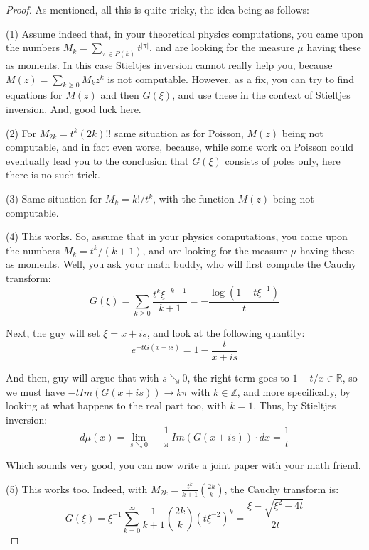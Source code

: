 \documentclass[12pt]{amsbook}
\begin{document}
\begin{proof}
As mentioned, all this is quite tricky, the idea being as follows:

\medskip

(1) Assume indeed that, in your theoretical physics computations, you came upon the numbers $M_k=\sum_{\pi\in P(k)}t^{|\pi|}$, and are looking for the measure $\mu$ having these as moments. In this case Stieltjes inversion cannot really help you, because $M(z)=\sum_{k\geq 0}M_kz^k$ is not computable. However, as a fix, you can try to find equations for $M(z)$ and then $G(\xi)$, and use these in the context of Stieltjes inversion. And, good luck here.

\medskip

(2) For $M_{2k}=t^k(2k)!!$ same situation as for Poisson, $M(z)$ being not computable, and in fact even worse, because, while some work on Poisson could eventually lead you to the conclusion that $G(\xi)$ consists of poles only, here there is no such trick.

\medskip

(3) Same situation for $M_k=k!/t^k$, with the function $M(z)$ being not computable.

\medskip

(4) This works. So, assume that in your physics computations, you came upon the numbers $M_k=t^k/(k+1)$, and are looking for the measure $\mu$ having these as moments. Well, you ask your math buddy, who will first compute the Cauchy transform:
$$G(\xi)=\sum_{k\geq0}\frac{t^k\xi^{-k-1}}{k+1}=-\frac{\log(1-t\xi^{-1})}{t}$$

Next, the guy will set $\xi=x+is$, and look at the following quantity:
$$e^{-tG(x+is)}=1-\frac{t}{x+is}$$

And then, guy will argue that with $s\searrow 0$, the right term goes to $1-t/x\in\mathbb R$, so we must have $-tIm(G(x+is))\to k\pi$ with $k\in\mathbb Z$, and more specifically, by looking at what happens to the real part too, with $k=1$. Thus, by Stieltjes inversion:
$$d\mu (x)=\lim_{s\searrow 0}-\frac{1}{\pi}\,Im\left(G(x+is)\right)\cdot dx=\frac{1}{t}$$

Which sounds very good, you can now write a joint paper with your math friend.

\medskip

(5) This works too. Indeed, with $M_{2k}=\frac{t^k}{k+1}\binom{2k}{k}$, the Cauchy transform is: 
$$G(\xi)
=\xi^{-1}\sum_{k=0}^\infty\frac{1}{k+1}\binom{2k}{k}(t\xi^{-2})^k
=\frac{\xi-\sqrt{\xi^2-4t}}{2t}$$


\end{proof}
\end{document}
